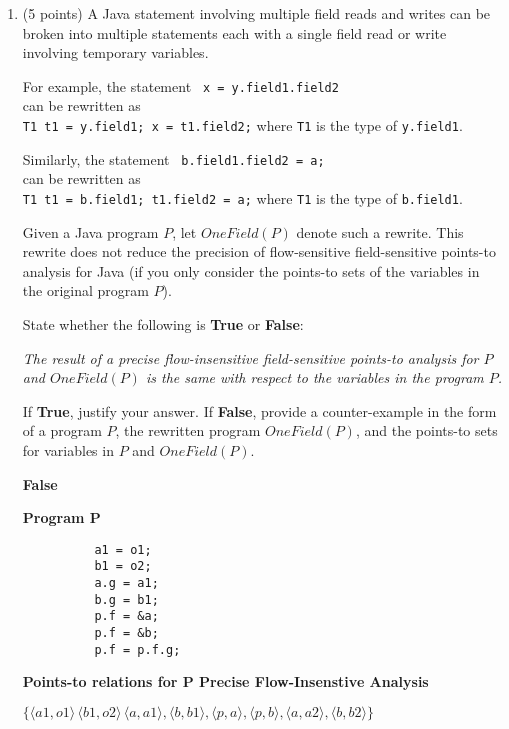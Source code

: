 \documentclass[12pt]{article}
\begin{document}
\begin{enumerate}
  \newpage
  \item (5 points) A Java statement involving multiple field reads and writes can be broken into
  multiple statements each with a single field read or write involving temporary variables.

  For example, the statement \lstinline$ x = y.field1.field2$ \\
  can be rewritten as \\ 
  \lstinline$T1 t1 = y.field1; x = t1.field2;$ where
  \lstinline$T1$ is the type of \lstinline$y.field1$.

  Similarly, the statement \lstinline$ b.field1.field2 = a;$ \\
  can  be rewritten as \\ 
  \lstinline$T1 t1 = b.field1; t1.field2 = a;$ where
  \lstinline$T1$ is the type of \lstinline$b.field1$.

  Given a Java program $P$, let $OneField(P)$ denote such a rewrite.
  This rewrite does not reduce the precision of flow-sensitive field-sensitive points-to analysis for Java
  (if you only consider the points-to sets of the variables in the original program $P$).
  
  State whether the following is \textbf{True} or \textbf{False}:

  \emph{The result of a precise flow-insensitive field-sensitive points-to analysis 
  for $P$ and $OneField(P)$ is the same with respect to the variables in 
  the program $P$.}

  If \textbf{True}, justify your answer.
  If \textbf{False}, provide a counter-example in the form of a program $P$,
  the rewritten program $OneField(P)$, and the points-to sets for variables
  in $P$ and $OneField(P)$.
    
  \begin{mdframed}
    \textbf{False}

    \textbf{Program P}
        \begin{lstlisting}
          a1 = o1;
          b1 = o2;
          a.g = a1;
          b.g = b1;
          p.f = &a;
          p.f = &b;
          p.f = p.f.g;
        \end{lstlisting}
        \textbf{Points-to relations for P Precise Flow-Insenstive Analysis}

        $\{\langle a1, o1 \rangle\, \langle b1, o2 \rangle\, \langle a, a1 \rangle, \langle b, b1 \rangle, \langle p, a \rangle, \langle p, b \rangle, \langle a, a2 \rangle, \langle b, b2 \rangle \}$


\end{mdframed}
\end{enumerate}
\end{document}
